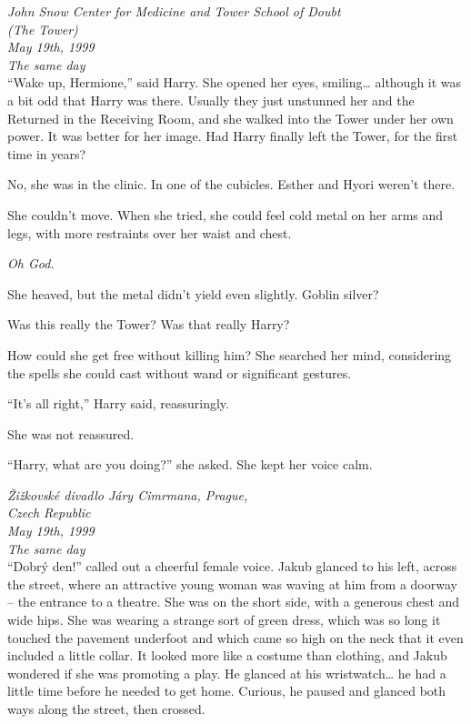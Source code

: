 \mybreak

\emph{John Snow Center for Medicine and Tower School of Doubt\\
(The Tower)}\\
\emph{May 19th, 1999}\\
\emph{The same day}\\

``Wake up, Hermione,'' said Harry. She opened her eyes, smiling\ldots{}
although it was a bit odd that Harry was there. Usually they just
unstunned her and the Returned in the Receiving Room, and she walked
into the Tower under her own power. It was better for her image. Had
Harry finally left the Tower, for the first time in years?

No, she was in the clinic. In one of the cubicles. Esther and Hyori
weren't there.

She couldn't move. When she tried, she could feel cold metal on her arms
and legs, with more restraints over her waist and chest.

\emph{Oh God.}

She heaved, but the metal didn't yield even slightly. Goblin silver?

Was this really the Tower? Was that really Harry?

How could she get free without killing him? She searched her mind,
considering the spells she could cast without wand or significant
gestures.

``It's all right,'' Harry said, reassuringly.

She was not reassured.

``Harry, what are you doing?'' she asked. She kept her voice calm.

\mybreak

\emph{Žižkovské divadlo Járy Cimrmana, Prague,\\
Czech Republic}\\
\emph{May 19th, 1999}\\
\emph{The same day}\\

``Dobrý den!'' called out a cheerful female voice. Jakub glanced to his
left, across the street, where an attractive young woman was waving at
him from a doorway -- the entrance to a theatre. She was on the short
side, with a generous chest and wide hips. She was wearing a strange
sort of green dress, which was so long it touched the pavement underfoot
and which came so high on the neck that it even included a little
collar. It looked more like a costume than clothing, and Jakub wondered
if she was promoting a play. He glanced at his wristwatch\ldots{} he had
a little time before he needed to get home. Curious, he paused and
glanced both ways along the street, then crossed.


